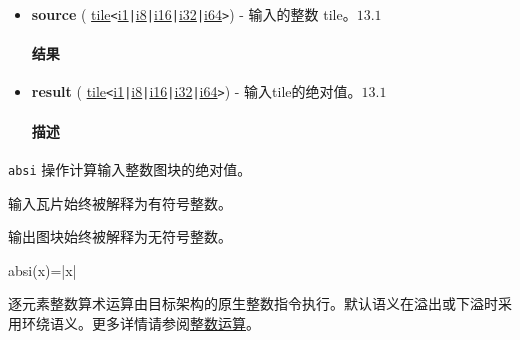 \documentclass{article}
\begin{document}
\begin{itemize}
\item \textbf{source} ( \href{https://docs.nvidia.com/cuda/tile-ir/latest/sections/types.html#type-tile}{tile}\texttt{<}\href{https://docs.nvidia.com/cuda/tile-ir/latest/sections/types.html#subsection-element-types}{i1}\texttt{|}\href{https://docs.nvidia.com/cuda/tile-ir/latest/sections/types.html#subsection-element-types}{i8}\texttt{|}\href{https://docs.nvidia.com/cuda/tile-ir/latest/sections/types.html#subsection-element-types}{i16}\texttt{|}\href{https://docs.nvidia.com/cuda/tile-ir/latest/sections/types.html#subsection-element-types}{i32}\texttt{|}\href{https://docs.nvidia.com/cuda/tile-ir/latest/sections/types.html#subsection-element-types}{i64}\texttt{>}) - 输入的整数 tile。$\boxed{13.1}$




\paragraph{结果}


\item \textbf{result} ( \href{https://docs.nvidia.com/cuda/tile-ir/latest/sections/types.html#type-tile}{tile}\texttt{<}\href{https://docs.nvidia.com/cuda/tile-ir/latest/sections/types.html#subsection-element-types}{i1}\texttt{|}\href{https://docs.nvidia.com/cuda/tile-ir/latest/sections/types.html#subsection-element-types}{i8}\texttt{|}\href{https://docs.nvidia.com/cuda/tile-ir/latest/sections/types.html#subsection-element-types}{i16}\texttt{|}\href{https://docs.nvidia.com/cuda/tile-ir/latest/sections/types.html#subsection-element-types}{i32}\texttt{|}\href{https://docs.nvidia.com/cuda/tile-ir/latest/sections/types.html#subsection-element-types}{i64}\texttt{>}) - 输入tile的绝对值。$\boxed{13.1}$




\paragraph{描述}


\end{itemize}
\texttt{absi} 操作计算输入整数图块的绝对值。



输入瓦片始终被解释为有符号整数。

输出图块始终被解释为无符号整数。



absi(x)=|x|


逐元素整数算术运算由目标架构的原生整数指令执行。默认语义在溢出或下溢时采用环绕语义。更多详情请参阅\href{https://docs.nvidia.com/cuda/tile-ir/latest/sections/operations.html#op-group-integer}{整数运算}。
\end{document}
